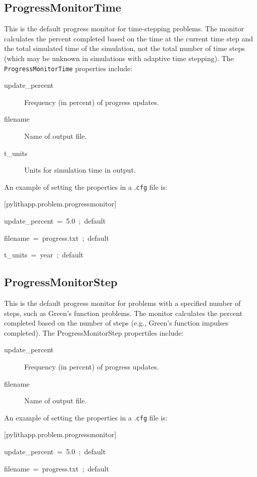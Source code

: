 \subsection{ProgressMonitorTime}

This is the default progress monitor for time-stepping problems. The
monitor calculates the percent completed based on the time at the
current time step and the total simulated time of the simulation,
not the total number of time steps (which may be unknown in simulations
with adaptive time stepping). The \texttt{ProgressMonitorTime} properties
include:
\begin{description}
\item [{update\_percent}] Frequency (in percent) of progress updates.
\item [{filename}] Name of output file.
\item [{t\_units}] Units for simulation time in output.
\end{description}
An example of setting the properties in a .\texttt{cfg} file is:
\begin{lyxcode}
{[}pylithapp.problem.progressmonitor{]}

update\_percent~=~5.0~;~default

filename~=~progress.txt~;~default

t\_units~=~year~;~default
\end{lyxcode}

\subsection{ProgressMonitorStep}

This is the default progress monitor for problems with a specified
number of steps, such as Green's function problems. The monitor calculates
the percent completed based on the number of steps (e.g., Green's
function impulses completed). The ProgressMonitorStep propertiles
include:
\begin{description}
\item [{update\_percent}] Frequency (in percent) of progress updates.
\item [{filename}] Name of output file.
\end{description}
An example of setting the properties in a .\texttt{cfg} file is:
\begin{lyxcode}
{[}pylithapp.problem.progressmonitor{]}

update\_percent~=~5.0~;~default

filename~=~progress.txt~;~default
\end{lyxcode}

